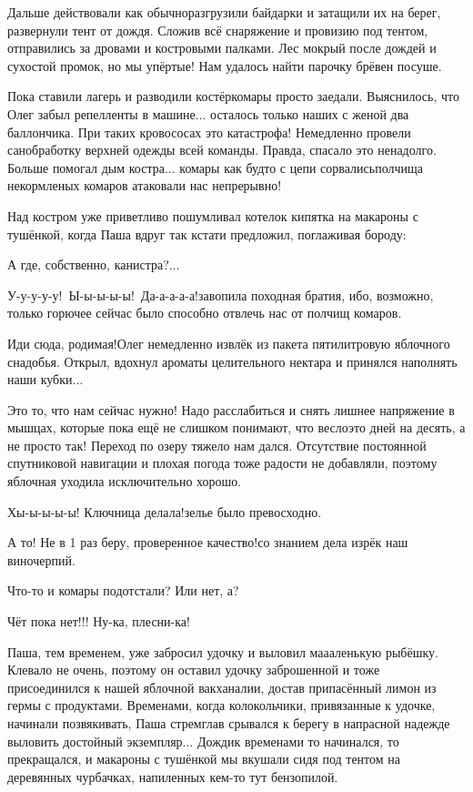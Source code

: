Дальше действовали как обычно\mdash разгрузили байдарки и затащили их на берег, развернули тент от дождя. Сложив всё снаряжение и провизию под тентом, отправились за дровами и костровыми палками. Лес мокрый после дождей и сухостой промок, но мы упёртые! Нам удалось найти парочку брёвен посуше. 

Пока ставили лагерь и разводили костёр\mdash комары просто заедали. Выяснилось, что Олег забыл репелленты в машине$\ldots$ осталось только наших с женой два баллончика. При таких кровососах это катастрофа! Немедленно провели санобработку верхней одежды всей команды. Правда, спасало это ненадолго. Больше помогал дым костра$\ldots$ комары как будто с цепи сорвались\mdash полчища некормленых комаров атаковали нас непрерывно!

Над костром уже приветливо пошумливал котелок кипятка на макароны с тушёнкой, когда Паша вдруг так кстати предложил, поглаживая бороду: 

\diagdash А где, собственно, канистра?$\ldots$

\diagdash У-у-у-у-у!~Ы-ы-ы-ы-ы!~Да-а-а-а-а!\mdash завопила походная братия, ибо, возможно, только горючее сейчас было способно отвлечь нас от полчищ комаров.
 
\diagdash Иди сюда, родимая!\mdash Олег немедленно извлёк из пакета пятилитровую яблочного снадобья. Открыл, вдохнул ароматы целительного нектара и принялся наполнять наши кубки$\ldots$

Это то, что нам сейчас нужно! Надо расслабиться и снять лишнее напряжение в мышцах, которые пока ещё не слишком понимают, что весло\mdash это дней на десять, а не просто так! Переход по озеру тяжело нам дался. Отсутствие постоянной спутниковой навигации и плохая погода тоже радости не добавляли, поэтому яблочная уходила исключительно хорошо.

\diagdash Хы-ы-ы-ы-ы! Ключница делала!\mdash зелье было превосходно.

\diagdash А то! Не в 1 раз беру, проверенное качество!\mdash со знанием дела изрёк наш виночерпий.

\diagdash Что-то и комары подотстали? Или нет, а?

\diagdash Чёт пока нет!!! Ну-ка, плесни-ка!

Паша, тем временем, уже забросил удочку и выловил ма\sdash а\sdash аленькую рыбёшку. Клевало не очень, поэтому он оставил удочку заброшенной и тоже присоединился к нашей яблочной вакханалии, достав припасённый лимон из гермы с продуктами. Временами, когда колокольчики, привязанные к удочке, начинали позвякивать, Паша стремглав срывался к берегу в напрасной надежде выловить достойный экземпляр$\ldots$ Дождик временами то начинался, то прекращался, и макароны с тушёнкой мы вкушали сидя под тентом на деревянных чурбачках, напиленных кем-то тут бензопилой. 

